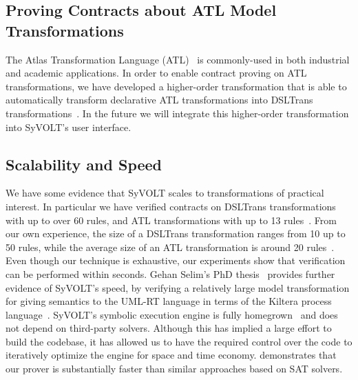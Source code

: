 \subsection{Proving Contracts about ATL Model Transformations}
The Atlas Transformation Language (ATL)~\cite{atlTool} is
commonly-used in both industrial and academic applications. In order to enable contract proving on ATL transformations, we
have developed a higher-order transformation that is able to automatically
transform declarative ATL transformations into DSLTrans transformations~\cite{Oakes}. 
In the future we will integrate this higher-order transformation into SyVOLT's
user interface.

\subsection{Scalability and Speed}

We have some evidence that SyVOLT scales to transformations of practical
interest. In particular we have verified contracts on DSLTrans transformations with up to
over 60 rules, and ATL transformations with up to 13 rules~\cite{Oakes}. From our own
experience, the size of a DSLTrans transformation ranges from 10 up to 50 rules, while the average size of an ATL
transformation is around 20 rules~\cite{KuselSWRSK13}.
Even though our technique is exhaustive, our experiments show that verification can be performed within seconds.
Gehan Selim's PhD thesis~\cite{Selim2015} provides further evidence of SyVOLT's speed, by verifying a relatively large model transformation
for giving semantics to the UML-RT language in terms of the Kiltera process
language~\cite{PosseDingel2014}. SyVOLT's symbolic execution engine is fully
homegrown~\cite{LucioVang} and does not depend on third-party solvers. Although
this has implied a large effort to build the codebase, it has allowed us to
have the required control over the code to iteratively optimize the engine for
space and time economy.
\cite{Selim2014} demonstrates that our prover is substantially faster than
similar approaches based on SAT solvers.








